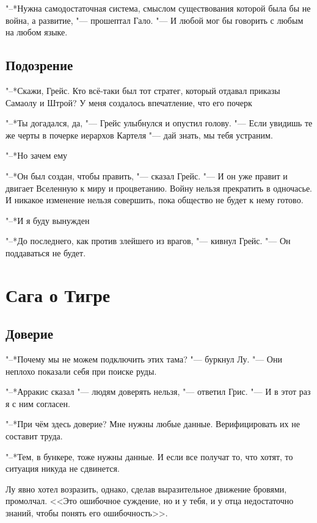 \documentclass[a4paper,10pt]{book}
\newcommand{\ldotst}{\so{...}\xspace}
\newcommand{\ldotsq}{\so{?\hbox{\hspace{-.212em}}..}\xspace}
\begin{document}
"--*Нужна самодостаточная система, смыслом существования которой была бы не 
война, а развитие, "--- прошептал Гало. "--- И любой мог бы говорить с любым на 
любом языке.

\section{Подозрение}

"--*Скажи, Грейс. Кто всё-таки был тот стратег, который отдавал приказы Самаолу и Штрой? У меня создалось впечатление, что его почерк\ldotst

"--*Ты догадался, да, "--- Грейс улыбнулся и опустил голову. "--- Если увидишь те же черты в почерке иерархов Картеля "--- дай знать, мы тебя устраним.

"--*Но зачем ему\ldotsq

"--*Он был создан, чтобы править, "--- сказал Грейс. "--- И он уже правит и двигает Вселенную к миру и процветанию. Войну нельзя прекратить в одночасье. И никакое изменение нельзя совершить, пока общество не будет к нему готово.

"--*И я буду вынужден\ldotst

"--*До последнего, как против злейшего из врагов, "--- кивнул Грейс. "--- Он поддаваться не будет.

\chapter{Сага о Тигре}

\section{Доверие}

"--*Почему мы не можем подключить этих тама? "--- буркнул Лу. "--- Они неплохо 
показали себя при поиске руды.

"--*Арракис сказал "--- людям доверять нельзя, "--- ответил Грис. "--- И в этот 
раз я с ним согласен.

"--*При чём здесь доверие? Мне нужны любые данные. Верифицировать их не 
составит 
труда.

"--*Тем, в бункере, тоже нужны данные. И если все получат то, что хотят, то 
ситуация никуда не сдвинется.

Лу явно хотел возразить, однако, сделав выразительное движение бровями, 
промолчал. <<Это ошибочное суждение, но и у тебя, и у отца недостаточно знаний, 
чтобы понять его ошибочность>>.
\end{document}
